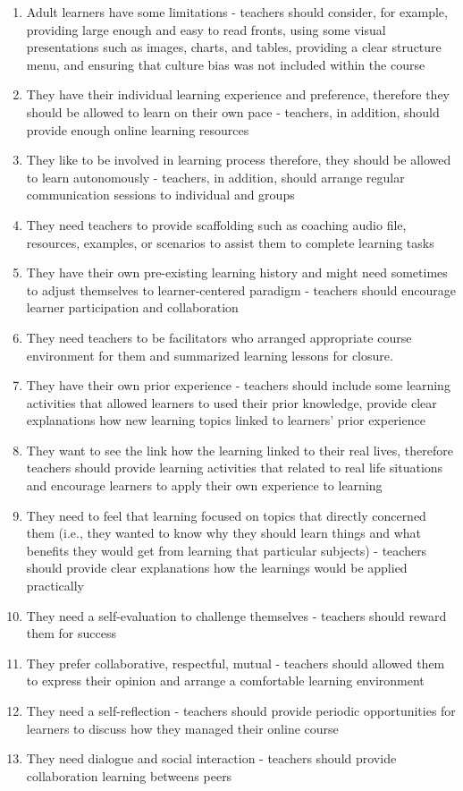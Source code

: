 \begin{enumerate}
\item Adult learners have some limitations - teachers should consider, for example, providing large enough and easy to read fronts, using some visual presentations such as images, charts, and tables, providing a clear structure menu, and ensuring that culture bias was not included within the course
\item They have their individual learning experience and preference, therefore they should be allowed to learn on their own pace - teachers, in addition, should provide enough online learning resources
\item They like to be involved in learning process therefore, they should be allowed to learn autonomously - teachers, in addition, should arrange regular communication sessions to individual and groups
\item They need teachers to provide scaffolding such as coaching audio file, resources, examples, or scenarios to assist them to complete learning tasks
\item They have their own pre-existing learning history and might need sometimes to adjust themselves to learner-centered paradigm - teachers should encourage learner participation and collaboration 
\item They need teachers to be facilitators who arranged appropriate course environment for them and summarized learning lessons for closure. 
\item They have their own prior experience - teachers should include some learning activities that allowed learners to used their prior knowledge, provide clear explanations how new learning topics linked to learners' prior experience
\item They want to see the link how the learning linked to their real lives, therefore teachers should provide learning activities that related to real life situations and encourage learners to apply their own experience to learning
\item They need to feel that learning focused on topics that directly concerned them (i.e., they wanted to know why they should learn things and what benefits they would get from learning that particular subjects) - teachers should provide clear explanations how the learnings would be applied practically
\item They need a self-evaluation to challenge themselves - teachers should reward them for success
\item They prefer collaborative, respectful, mutual - teachers should allowed them to express their opinion and arrange a comfortable learning environment
\item They need a self-reflection - teachers should provide periodic opportunities for learners to discuss how they managed their online course
\item They need dialogue and social interaction - teachers should provide collaboration learning betweens peers 
\end{enumerate}



